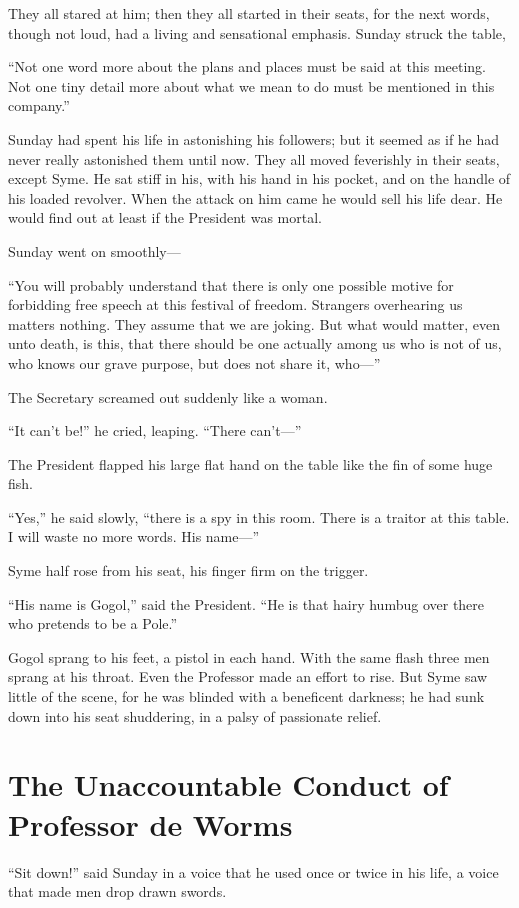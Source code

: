 \documentclass{book}
\begin{document}
They all stared at him; then they all started in their seats, for the next words, though not loud, had a living and sensational emphasis. Sunday struck the table,

“Not one word more about the plans and places must be said at this meeting. Not one tiny detail more about what we mean to do must be mentioned in this company.”

Sunday had spent his life in astonishing his followers; but it seemed as if he had never really astonished them until now. They all moved feverishly in their seats, except Syme. He sat stiff in his, with his hand in his pocket, and on the handle of his loaded revolver. When the attack on him came he would sell his life dear. He would find out at least if the President was mortal.

Sunday went on smoothly—

“You will probably understand that there is only one possible motive for forbidding free speech at this festival of freedom. Strangers overhearing us matters nothing. They assume that we are joking. But what would matter, even unto death, is this, that there should be one actually among us who is not of us, who knows our grave purpose, but does not share it, who—”

The Secretary screamed out suddenly like a woman.

“It can’t be!” he cried, leaping. “There can’t—”

The President flapped his large flat hand on the table like the fin of some huge fish.

“Yes,” he said slowly, “there is a spy in this room. There is a traitor at this table. I will waste no more words. His name—”

Syme half rose from his seat, his finger firm on the trigger.

“His name is Gogol,” said the President. “He is that hairy humbug over there who pretends to be a Pole.”

Gogol sprang to his feet, a pistol in each hand. With the same flash three men sprang at his throat. Even the Professor made an effort to rise. But Syme saw little of the scene, for he was blinded with a beneficent darkness; he had sunk down into his seat shuddering, in a palsy of passionate relief.

\chapter{The Unaccountable Conduct of Professor de Worms}
\label{chapter-6}
“Sit down!” said Sunday in a voice that he used once or twice in his life, a voice that made men drop drawn swords.
\end{document}
